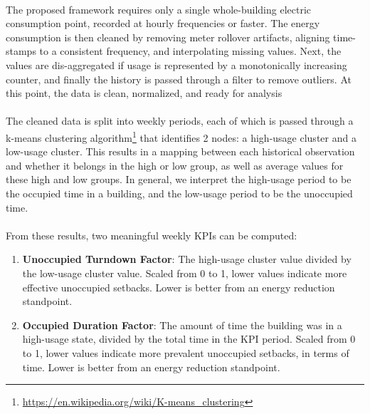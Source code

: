 \documentclass[a4paper]{article}
\begin{document}
\paragraph{}
The proposed framework requires only a single whole-building electric consumption point, recorded at hourly frequencies or faster. The energy consumption is then cleaned by removing meter rollover artifacts, aligning time-stamps to a consistent frequency, and interpolating missing values. Next, the values are dis-aggregated if usage is represented by a monotonically increasing counter, and finally the history is passed through a filter to remove outliers. At this point, the data is clean, normalized, and ready for analysis

\paragraph{}
The cleaned data is split into weekly periods, each of which is passed through a k-means clustering algorithm\footnote{\url{https://en.wikipedia.org/wiki/K-means\_clustering}} that identifies 2 nodes: a high-usage cluster and a low-usage cluster. This results in a mapping between each historical observation and whether it belongs in the high or low group, as well as average values for these high and low groups. In general, we interpret the high-usage period to be the occupied time in a building, and the low-usage period to be the unoccupied time.

\paragraph{}
From these results, two meaningful weekly KPIs can be computed:
\begin{enumerate}
\item{\textbf{Unoccupied Turndown Factor}: The high-usage cluster value divided by the low-usage cluster value. Scaled from 0 to 1, lower values indicate more effective unoccupied setbacks. Lower is better from an energy reduction standpoint.}
\item{\textbf{Occupied Duration Factor}: The amount of time the building was in a high-usage state, divided by the total time in the KPI period. Scaled from 0 to 1, lower values indicate more prevalent unoccupied setbacks, in terms of time.  Lower is better from an energy reduction standpoint.}
\end{enumerate}
\end{document}

